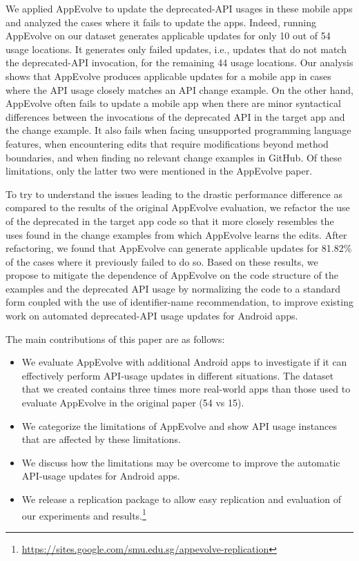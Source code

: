 We applied AppEvolve to update the deprecated-API usages in these mobile
apps and analyzed the cases where it fails to update the apps. Indeed,
running AppEvolve on our dataset generates applicable updates for only 10
out of 54 usage locations.  It generates only failed updates, i.e., updates
that do not match the deprecated-API invocation, for the remaining 44 usage
locations. Our analysis shows that AppEvolve produces applicable updates
for a mobile app in cases where the API usage closely matches an API change
example.  On the other hand, AppEvolve often fails to update a mobile app
when there are minor syntactical differences between the invocations of the
deprecated API in the target app and the change example.  It also fails
when facing unsupported 
programming language features, when encountering edits that require
modifications beyond method boundaries, and when finding no relevant change
examples in GitHub.  Of these limitations, only the latter two were
mentioned in the AppEvolve paper.

To try to understand the issues leading to the drastic performance
difference as compared to the results of the original AppEvolve evaluation,
we refactor the use of the deprecated in the target app code so that it
more closely resembles the uses found in the change examples from which
AppEvolve learns the edits.  After refactoring, we found that AppEvolve can
generate applicable updates for 81.82\% of the cases where it previously
failed to do so.  Based on these results, we propose to mitigate the
dependence of AppEvolve on the code structure of the examples and the
deprecated API usage by normalizing the code to a standard form coupled
with the use of identifier-name recommendation, to improve existing work on
automated deprecated-API usage updates for Android apps.

The main contributions of this paper are as follows:
\begin{itemize}
	\item We  evaluate AppEvolve with additional Android apps to investigate if it can effectively perform API-usage updates in different situations. The dataset that we created contains three times more real-world apps than those used to evaluate AppEvolve in the original paper (54 vs 15).
	\item We categorize the limitations of AppEvolve and show API usage
	instances that are affected by these limitations.
	\item We discuss how the limitations may be overcome to improve the automatic API-usage updates for Android apps.
	\item We release a replication package to allow easy replication
	and evaluation of our experiments and results.\footnote{\url{https://sites.google.com/smu.edu.sg/appevolve-replication}}
	 
\end{itemize}

